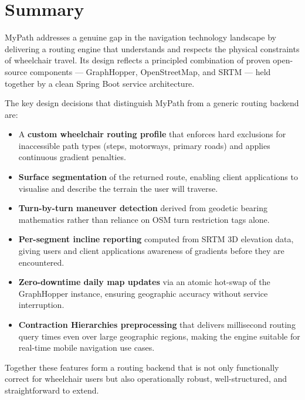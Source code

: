 \documentclass[12pt, a4paper]{report}
\begin{document}
\section{Summary}
\label{sec:summary}

MyPath addresses a genuine gap in the navigation technology landscape by delivering a routing engine that understands and respects the physical constraints of wheelchair travel. Its design reflects a principled combination of proven open-source components — GraphHopper, OpenStreetMap, and SRTM — held together by a clean Spring Boot service architecture.

The key design decisions that distinguish MyPath from a generic routing backend are:

\begin{itemize}[leftmargin=*]
  \item A \textbf{custom wheelchair routing profile} that enforces hard exclusions for inaccessible path types (steps, motorways, primary roads) and applies continuous gradient penalties.
  \item \textbf{Surface segmentation} of the returned route, enabling client applications to visualise and describe the terrain the user will traverse.
  \item \textbf{Turn-by-turn maneuver detection} derived from geodetic bearing mathematics rather than reliance on OSM turn restriction tags alone.
  \item \textbf{Per-segment incline reporting} computed from SRTM 3D elevation data, giving users and client applications awareness of gradients before they are encountered.
  \item \textbf{Zero-downtime daily map updates} via an atomic hot-swap of the GraphHopper instance, ensuring geographic accuracy without service interruption.
  \item \textbf{Contraction Hierarchies preprocessing} that delivers millisecond routing query times even over large geographic regions, making the engine suitable for real-time mobile navigation use cases.
\end{itemize}

Together these features form a routing backend that is not only functionally correct for wheelchair users but also operationally robust, well-structured, and straightforward to extend.
\end{document}

